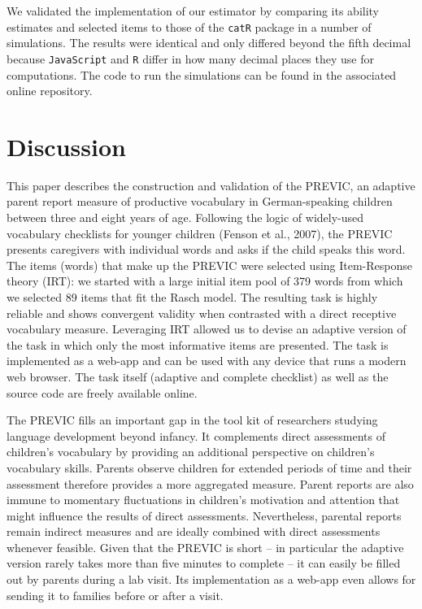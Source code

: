 \documentclass[
  man,floatsintext]{apa6}
\begin{document}
We validated the implementation of our estimator by comparing its ability estimates and selected items to those of the \texttt{catR} package in a number of simulations. The results were identical and only differed beyond the fifth decimal because \texttt{JavaScript} and \texttt{R} differ in how many decimal places they use for computations. The code to run the simulations can be found in the associated online repository.

\hypertarget{discussion}{%
\section{Discussion}\label{discussion}}

This paper describes the construction and validation of the PREVIC, an adaptive parent report measure of productive vocabulary in German-speaking children between three and eight years of age. Following the logic of widely-used vocabulary checklists for younger children (Fenson et al., 2007), the PREVIC presents caregivers with individual words and asks if the child speaks this word. The items (words) that make up the PREVIC were selected using Item-Response theory (IRT): we started with a large initial item pool of 379 words from which we selected 89 items that fit the Rasch model. The resulting task is highly reliable and shows convergent validity when contrasted with a direct receptive vocabulary measure. Leveraging IRT allowed us to devise an adaptive version of the task in which only the most informative items are presented. The task is implemented as a web-app and can be used with any device that runs a modern web browser. The task itself (adaptive and complete checklist) as well as the source code are freely available online.

The PREVIC fills an important gap in the tool kit of researchers studying language development beyond infancy. It complements direct assessments of children's vocabulary by providing an additional perspective on children's vocabulary skills. Parents observe children for extended periods of time and their assessment therefore provides a more aggregated measure. Parent reports are also immune to momentary fluctuations in children's motivation and attention that might influence the results of direct assessments. Nevertheless, parental reports remain indirect measures and are ideally combined with direct assessments whenever feasible. Given that the PREVIC is short -- in particular the adaptive version rarely takes more than five minutes to complete -- it can easily be filled out by parents during a lab visit. Its implementation as a web-app even allows for sending it to families before or after a visit.
\end{document}
